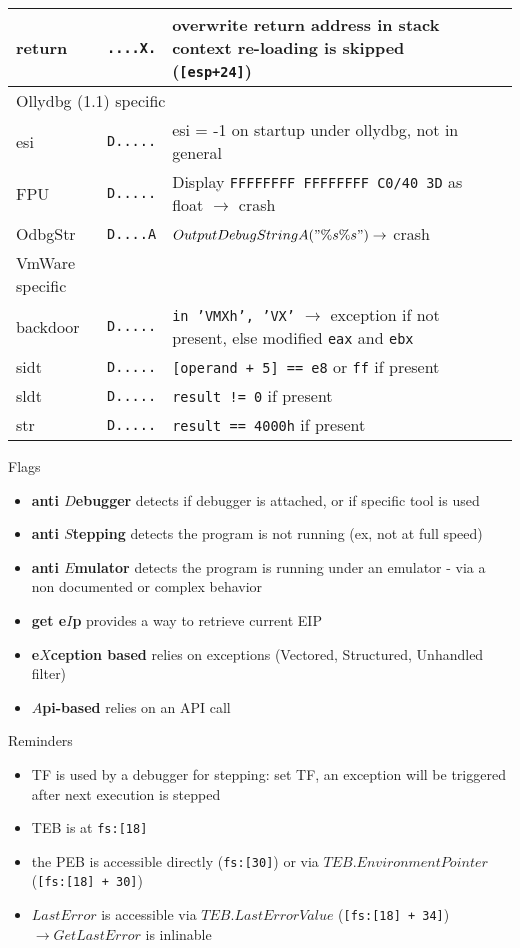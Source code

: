 \begin{tabular}{lllll}
return				& {\tt ....X.} & overwrite return address in stack \ra context re-loading is skipped ({\tt [esp+24]}) \rowcolors{0}{white}{lightgray}
\\
\midrule
\multicolumn{3}{l}{Ollydbg (1.1) specific} \\
\midrule
esi				& {\tt D.....} & esi = -1 on startup under ollydbg, not in general \\
FPU				& {\tt D.....} & Display {\tt FFFFFFFF FFFFFFFF C0/40 3D} as float $\rightarrow$ crash \\
OdbgStr			& {\tt D....A} & $OutputDebugStringA("\%s\%s") \rightarrow$ crash \rowcolors{0}{white}{lightgray}
\\ 
\midrule
VmWare specific \\
\midrule
backdoor			& {\tt D.....} & {\tt in 'VMXh', 'VX'} $\rightarrow$ exception if not present, else modified {\tt eax} and {\tt ebx} \\
sidt				& {\tt D.....} & {\tt [operand + 5] == e8} or {\tt ff} if present \\
sldt				& {\tt D.....} & {\tt result != 0} if present \\
str				& {\tt D.....} & {\tt result == 4000h} if present \rowcolors{0}{white}{lightgray}
\\
\bottomrule
\end{tabular}

\sig

\newpage

{\large Flags}
\begin{itemize}
\item {\bf anti $D$ebugger}
detects if debugger is attached, or if specific tool is used
\item {\bf anti $S$tepping}
detects the program is not running (ex, not at full speed)
\item {\bf anti $E$mulator}
detects the program is running under an emulator - via a non documented or complex behavior
\item {\bf get e$I$p}
provides a way to retrieve current EIP
\item {\bf e$X$ception based}
relies on exceptions (Vectored, Structured, Unhandled filter)
\item {\bf $A$pi-based}
relies on an API call
\end{itemize}


{\large Reminders}
\begin{itemize}
\item
TF is used by a debugger for stepping: set TF, an exception will be triggered after next execution is stepped
\item
TEB is at {\tt fs:[18]}
\item
the PEB is accessible directly ({\tt fs:[30]}) or via $TEB.EnvironmentPointer$ ({\tt [fs:[18] + 30]})
\item
$LastError$ is accessible via $TEB.LastErrorValue$ ({\tt [fs:[18] + 34]}) $\rightarrow GetLastError$ is inlinable
\end{itemize}

